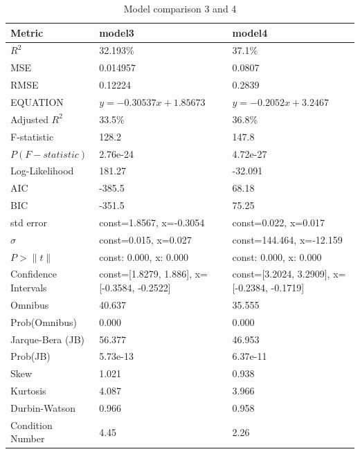 \documentclass{article}
\begin{document}
  \begin{table}[H]
  
  \scriptsize 
    \setlength{\extrarowheight}{-2pt} 

  \begin{tabular}{|l|l|l|}
  \hline
  \textbf{Metric} & \textbf{model3} & \textbf{model4} \\
  \hline
  $R^2$ & 32.193\% & 37.1\% \\
  \hline
  MSE & 0.014957 & 0.0807 \\
  \hline
  RMSE & 0.12224 & 0.2839 \\
  \hline
  EQUATION & $y=-0.30537x+1.85673$ & $y=-0.2052x+3.2467$ \\
  \hline
  Adjusted $R^2$ & 33.5\% & 36.8\% \\
  \hline
  F-statistic & 128.2 & 147.8 \\
  \hline
  $P(F-statistic)$ & 2.76e-24 & 4.72e-27 \\
  \hline
  Log-Likelihood & 181.27 & -32.091 \\
  \hline
  AIC & -385.5 & 68.18 \\
  \hline
  BIC & -351.5 & 75.25 \\
  \hline
  std error & const=1.8567, x=-0.3054 & const=0.022, x=0.017 \\
  \hline
  $\sigma$ & const=0.015, x=0.027 & const=144.464, x=-12.159 \\
  \hline
  $P>\|t\|$ & const: 0.000, x: 0.000 & const: 0.000, x: 0.000 \\
  \hline
  Confidence Intervals & const=[1.8279, 1.886], x=[-0.3584, -0.2522] & const=[3.2024, 3.2909], x=[-0.2384, -0.1719] \\
  \hline
  Omnibus & 40.637 & 35.555 \\
  \hline
  Prob(Omnibus) & 0.000 & 0.000 \\
  \hline
  Jarque-Bera (JB) & 56.377 & 46.953 \\
  \hline
  Prob(JB) & 5.73e-13 & 6.37e-11 \\
  \hline
  Skew & 1.021 & 0.938 \\
  \hline
  Kurtosis & 4.087 & 3.966 \\
  \hline
  Durbin-Watson & 0.966 & 0.958 \\
  \hline
  Condition Number & 4.45 & 2.26 \\
  \hline
  \end{tabular}
  \caption{Model comparison 3 and 4}
  \label{tab:modelos34}
  \end{table}
\end{document}
